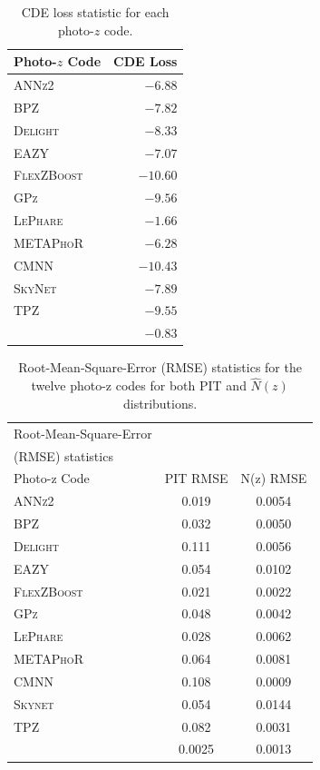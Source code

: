 \begin{table}  %
\centering
\caption{CDE loss statistic for each photo-$z$ code.} \label{tab:cdeloss}
\begin{tabular}{lr}
\hline
\bf Photo-$z$ Code & \bf CDE Loss \\
\hline
\textsc{ANNz2} 		& $-6.88$ \\
\textsc{BPZ} 		& $-7.82$ \\
\textsc{Delight}    & $-8.33$\\
\textsc{EAZY}       & $-7.07$ \\
\textsc{FlexZBoost} & $-10.60$\\
\textsc{GPz} 		& $-9.56$ \\
\textsc{LePhare} 	& $-1.66$ \\
\textsc{METAPhoR} 	& $-6.28$ \\
\textsc{CMNN}         & $-10.43$ \\
\textsc{SkyNet} 	& $-7.89$ \\
\textsc{TPZ} 		& $-9.55$ \\
\hline
\trainz		& $-0.83$ \\
\end{tabular}
\end{table}

\begin{table}
\setlength{\tabcolsep}{2pt}
\begin{center}
\caption{Root-Mean-Square-Error (RMSE) statistics for the twelve photo-z codes for both PIT and $\hat{N}(z)$ distributions.}\label{tab:rmse}
\begin{tabular}{lcc}
\hline
\hline
Root-Mean-Square-Error \\
(RMSE) statistics \\
\hline
Photo-z Code & PIT RMSE & N(z) RMSE\\
\hline
\textsc{ANNz2}      & 0.019 & 0.0054\\
\textsc{BPZ}        & 0.032 & 0.0050\\
\textsc{Delight}    & 0.111 & 0.0056\\
\textsc{EAZY}       & 0.054 & 0.0102\\
\textsc{FlexZBoost} & 0.021 & 0.0022\\
\textsc{GPz}        & 0.048 & 0.0042\\
\textsc{LePhare}    & 0.028 & 0.0062\\
\textsc{METAPhoR}   & 0.064 & 0.0081\\
\textsc{CMNN}         & 0.108 & 0.0009\\
\textsc{Skynet}     & 0.054 & 0.0144\\
\textsc{TPZ}        & 0.082 & 0.0031\\
\hline
\trainz		& 0.0025 & 0.0013\\
\end{tabular}
\end{center}
\end{table}

